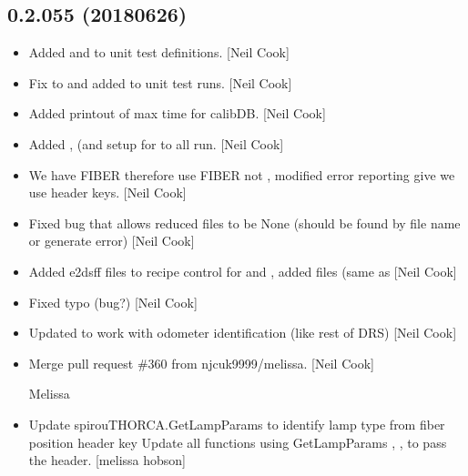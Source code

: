 \documentclass[a4paper,10pt,english]{report}
\begin{document}
\subsection{0.2.055 (2018\sphinxhyphen{}06\sphinxhyphen{}26)}
\label{\detokenize{misc/changelog:id429}}\begin{itemize}
\item {} 
Added  and  to unit test definitions. {[}Neil Cook{]}

\item {} 
Fix to  and  added to unit test runs. {[}Neil Cook{]}

\item {} 
Added printout of max time for calibDB. {[}Neil Cook{]}

\item {} 
Added ,  (and setup for  to all run. {[}Neil
Cook{]}

\item {} 
We have FIBER therefore use FIBER not , modified error
reporting give we use header keys. {[}Neil Cook{]}

\item {} 
Fixed bug that allows reduced files to be None (should be found by
file name or generate error) {[}Neil Cook{]}

\item {} 
Added e2dsff files to recipe control for  and , added
 files (same as  {[}Neil Cook{]}

\item {} 
Fixed typo (bug?) {[}Neil Cook{]}

\item {} 
Updated to work with odometer identification (like rest of DRS) {[}Neil
Cook{]}

\item {} 
Merge pull request \#360 from njcuk9999/melissa. {[}Neil Cook{]}

Melissa

\item {} 
Update spirouTHORCA.GetLampParams to identify lamp type from fiber
position header key Update all functions using GetLampParams ,
,   to pass the header. {[}melissa\sphinxhyphen{}
hobson{]}


\end{itemize}
\end{document}
